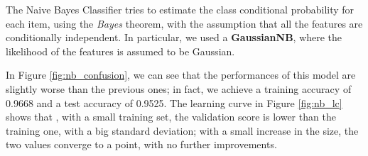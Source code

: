 The Naive Bayes Classifier tries to estimate the class conditional probability for each item, using the \emph{Bayes} theorem, with the assumption that all the features are conditionally independent. In particular, we used a \textbf{GaussianNB}, where the likelihood of the features is assumed to be Gaussian.

In Figure \ref{fig:nb_confusion}, we can see that the performances of this model are slightly worse than the previous ones; in fact, we achieve a training accuracy of 0.9668 and a test accuracy of 0.9525.  
The learning curve in Figure \ref{fig:nb_lc} shows that , with a small training set, the validation score is lower than the training one, with a big standard deviation; with a small increase in the size, the two values converge to a point, with no further improvements.

